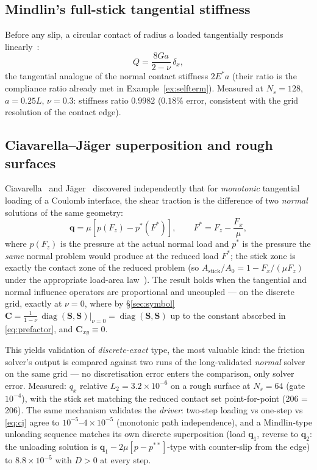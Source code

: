 \documentclass[11pt,a4paper]{article}
\newcommand{\bq}{\mathbf{q}}
\newcommand{\bC}{\mathbf{C}}
\newcommand{\bS}{\mathbf{S}}
\newcommand{\Estar}{E^{*}}
\begin{document}
\subsection{Mindlin's full-stick tangential stiffness}

Before any slip, a circular contact of radius $a$ loaded tangentially
responds linearly~\cite{Mindlin1949}:
\begin{equation}
  Q = \frac{8 G a}{2-\nu}\, \delta_x ,
\end{equation}
the tangential analogue of the normal contact stiffness $2\Estar a$ (their
ratio is the compliance ratio already met in
Example~\ref{ex:selfterm}). Measured at $N_s = 128$, $a = 0.25L$,
$\nu = 0.3$: stiffness ratio $0.9982$ ($0.18\%$ error, consistent with the
grid resolution of the contact edge).

\subsection{Ciavarella--J\"ager superposition and rough surfaces}
\label{sec:cj}

Ciavarella~\cite{Ciavarella1998} and J\"ager~\cite{Jager1998} discovered
independently that for \emph{monotonic} tangential loading of a Coulomb
interface, the shear traction is the difference of two \emph{normal}
solutions of the same geometry:
\begin{equation}
  \bq = \mu \left[ p(F_z) - p^{*}(F^{*}) \right],
  \qquad
  F^{*} = F_z - \frac{F_x}{\mu},
  \label{eq:cj}
\end{equation}
where $p(F_z)$ is the pressure at the actual normal load and $p^*$ is the
pressure the \emph{same} normal problem would produce at the reduced load
$F^*$; the stick zone is exactly the contact zone of the reduced problem
(so $A_{\mathrm{stick}}/A_0 = 1 - F_x/(\mu F_z)$ under the appropriate
load-area law~\cite{PaggiPohrtPopov2014}). The result holds when the
tangential and normal influence operators are proportional and uncoupled
--- on the discrete grid, exactly at $\nu = 0$, where by
\S\ref{sec:symbol} $\bC = \frac{1}{1-\nu}\,\operatorname{diag}(\bS,\bS)
\big|_{\nu=0} = \operatorname{diag}(\bS, \bS)$ up to the constant
absorbed in \eqref{eq:prefactor}, and $\bC_{xy} \equiv 0$.

This yields validation of \emph{discrete-exact} type, the most valuable
kind: the friction solver's output is compared against two runs of the
long-validated \emph{normal} solver on the same grid --- no discretisation
error enters the comparison, only solver error. Measured: $q_x$ relative
$L_2 = 3.2\times10^{-6}$ on a rough surface at $N_s = 64$ (gate $10^{-4}$),
with the stick set matching the reduced contact set point-for-point
(206 = 206). The same mechanism validates the \emph{driver}: two-step
loading vs one-step vs \eqref{eq:cj} agree to $10^{-5}$--$4\times10^{-5}$
(monotonic path independence), and a Mindlin-type unloading sequence
matches its own discrete superposition (load $\bq_1$, reverse to $\bq_2$:
the unloading solution is $\bq_1 - 2\mu[p - p^{**}]$-type with counter-slip
from the edge) to $8.8\times10^{-5}$ with $D > 0$ at every step.
\end{document}
